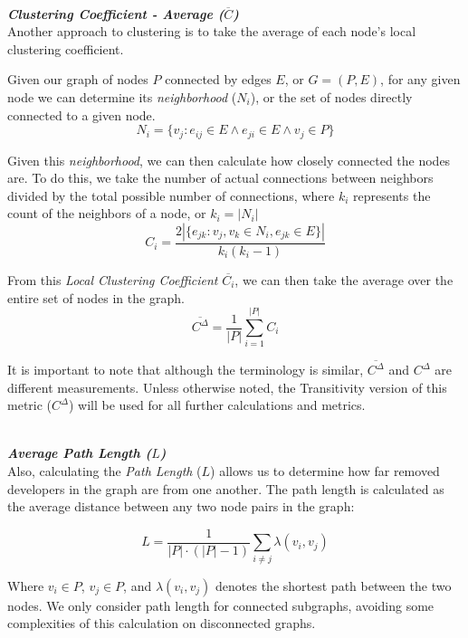 \documentclass{proc}
\begin{document}
\noindent\\\textit{\textbf{Clustering Coefficient - Average ($\overline{C}$)}}\\
Another approach to clustering is to take the average of each node's local clustering coefficient\cite{watts1998collective}.

Given our graph of nodes $P$ connected by edges $E$, or ${G=(P,E)}$, for any given node we can determine its \textit{neighborhood} ($N_i$), or the set of nodes directly connected to a given node.
\[ N_i = \{v_j : e_{ij} \in E \wedge e_{ji} \in E \wedge v_j \in P\} \]

Given this \textit{neighborhood}, we can then calculate how closely connected the nodes are. To do this, we take the number of actual connections between neighbors divided by the total possible number of connections, where $k_i$ represents the count of the neighbors of a node, or {$k_i = |N_i|$}
\[ C_i = \frac{2|\{e_{jk}: v_j,v_k \in N_i, e_{jk} \in E\}|}{k_i(k_i-1)} \]

From this \textit{Local Clustering Coefficient} $\overline{C_i}$, we can then take the average over the entire set of nodes in the graph.
\[ \overline{C^\Delta} = \frac{1}{|P|}\sum^{|P|}_{i=1}C_i \]

It is important to note that although the terminology is similar\cite{uzzi2005collaboration}, $\overline{C^\Delta}$ and $C^\Delta$ are different measurements. Unless otherwise noted, the Transitivity version of this metric ($C^\Delta$) will be used for all further calculations and metrics.

\noindent\\\textit{\textbf{Average Path Length ($L$)}}\\
Also, calculating the \textit{Path Length} ($L$) allows us to determine how far removed developers in the graph are from one another. The path length is calculated as the average distance between any two node pairs in the graph:

\[L = \frac{1}{|P| \cdot (|P|-1)} \sum_{i \neq j}\lambda(v_i,v_j)\]

Where {$v_i \in P$}, {$v_j \in P$}, and {$\lambda(v_i,v_j)$} denotes the shortest path between the two nodes. We only consider path length for connected subgraphs, avoiding some complexities of this calculation on disconnected graphs\cite{boccaletti2006complex}.
\end{document}
